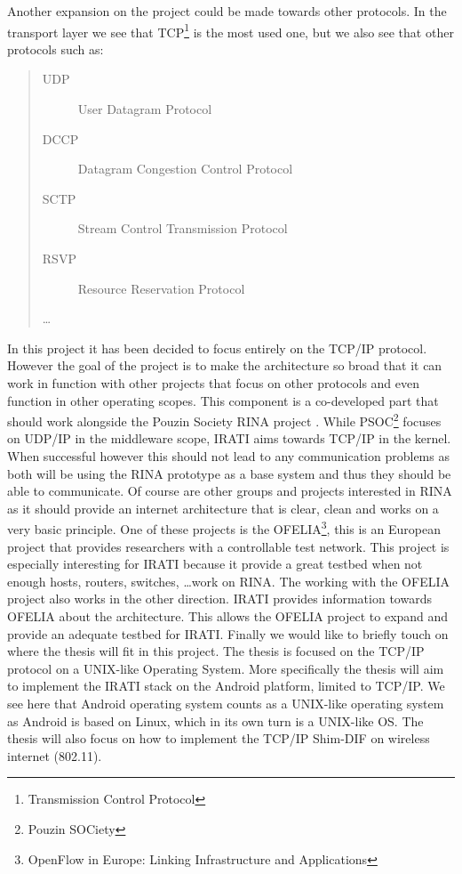 \npar
Another expansion on the project could be made towards other protocols. In the transport layer we see that TCP\footnote{Transmission Control Protocol} is the most used one, but we also see that other protocols such as: 
\begin{quote}
\begin{description}
	\item[UDP] User Datagram Protocol
	\item[DCCP] Datagram Congestion Control Protocol
	\item[SCTP] Stream Control Transmission Protocol
	\item[RSVP] Resource Reservation Protocol
	\item[\ldots] \hfill
\end{description}
\end{quote}
In this project it has been decided to focus entirely on the TCP/IP protocol. However the goal of the project is to make the architecture so broad that it can work in function with other projects that focus on other protocols and even function in other operating scopes. This component is a co-developed part that should work alongside the Pouzin Society RINA project \citep{website:pouzin_society}. While PSOC\footnote{Pouzin SOCiety} focuses on UDP/IP in the middleware scope, IRATI aims towards TCP/IP in the kernel. When successful however this should not lead to any communication problems as both will be using the RINA prototype as a base system and thus they should be able to communicate. 
\npar
Of course are other groups and projects interested in RINA as it should provide an internet architecture that is clear, clean and works on a very basic principle. One of these projects is the OFELIA\footnote{OpenFlow in Europe: Linking Infrastructure and Applications}, this is an European project that provides researchers with a controllable test network. This project is especially interesting for IRATI because it provide a great testbed when not enough hosts, routers, switches, \ldots work on RINA. The working with the OFELIA project also works in the other direction. IRATI provides information towards OFELIA about the architecture. This allows the OFELIA project to expand and provide an adequate testbed for IRATI.
\npar
Finally we would like to briefly touch on where the thesis will fit in this project. The thesis is focused on the TCP/IP protocol on a UNIX-like Operating System. More specifically the thesis will aim to implement the IRATI stack on the Android platform, limited to TCP/IP. We see here that Android operating system counts as a UNIX-like operating system as Android is based on Linux, which in its own turn is a UNIX-like OS. The thesis will also focus on how to implement the TCP/IP Shim-DIF on wireless internet (802.11).


